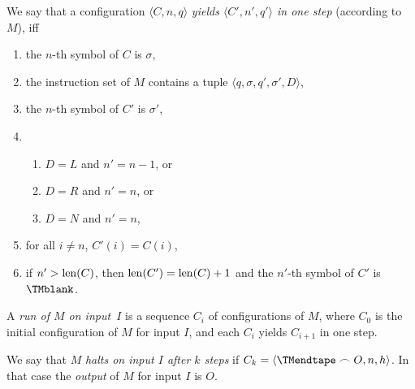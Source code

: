\documentclass[../../include/open-logic-section]{subfiles}
\begin{document}
\begin{defn}
We say that a configuration $\langle C, n, q\rangle$ \emph{yields
  $\langle C', n', q'\rangle$ in one step} (according to $M$), iff
\begin{enumerate}
\item the $n$-th symbol of $C$ is $\sigma$,
\item the instruction set of $M$ contains a tuple $\langle q, \sigma,
  q', \sigma', D\rangle$,
\item the $n$-th symbol of $C'$ is $\sigma'$,
\item
\begin{enumerate}
\item $D = L$ and $n' = n -1$, or
\item $D = R$ and $n' = n$, or
\item $D = N$ and $n' = n$,
\end{enumerate}
\item for all $i \neq n$, $C'(i) = C(i)$,
\item if $n' > \mathrm{len}(C)$, then $\mathrm{len}(C') = \mathrm{len}(C) + 1$ and the $n'$-th
  symbol of $C'$ is $\TMblank$.
\end{enumerate}
\end{defn}

\begin{defn}
A \emph{run of $M$ on input~$I$} is a sequence $C_i$ of configurations
of $M$, where $C_0$ is the initial configuration of $M$ for input $I$,
and each $C_i$ yields $C_{i+1}$ in one step.

We say that $M$ \emph{halts on input $I$ after $k$ steps} if $C_k =
\langle \TMendtape \frown O, n, h\rangle$.  In that case the
\emph{output} of $M$ for input $I$ is $O$.
\end{defn}
\end{document}
